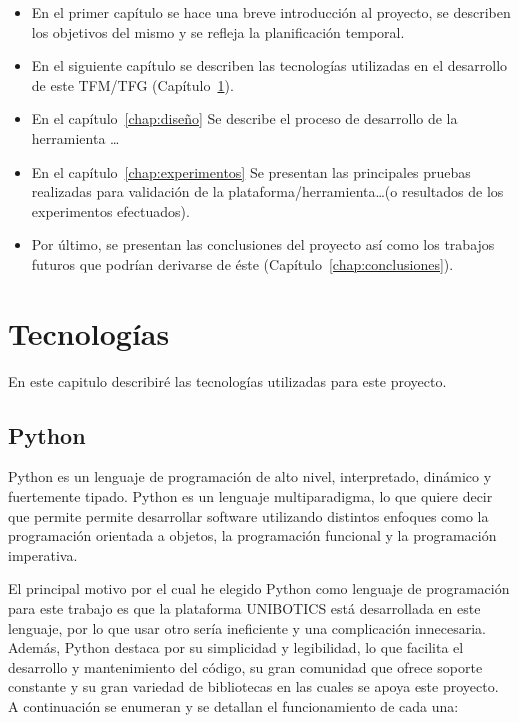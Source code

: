 \documentclass[a4paper, 12pt]{book}
\begin{document}
    \begin{itemize}
      \item En el primer capítulo se hace una breve introducción al proyecto, se describen los objetivos del mismo y se refleja la planificación temporal.
      \item En el siguiente capítulo se describen las tecnologías utilizadas en el desarrollo de este TFM/TFG (Capítulo~\ref{chap:tecnologias}).
      \item En el capítulo~\ref{chap:diseño} Se describe el proceso de desarrollo
      de la herramienta \ldots
      \item En el capítulo~\ref{chap:experimentos} Se presentan las principales pruebas realizadas
      para validación de la plataforma/herramienta\ldots (o resultados de los experimentos
      efectuados).
      \item Por último, se presentan las conclusiones del proyecto así como los trabajos futuros que podrían derivarse de éste (Capítulo~\ref{chap:conclusiones}).
    \end{itemize}

\cleardoublepage


\chapter{Tecnologías}               %
\label{chap:tecnologias}

En este capitulo describiré las tecnologías utilizadas para este proyecto.


\section{Python}
\label{sec:python}

Python es un lenguaje de programación de alto nivel, interpretado, dinámico y fuertemente tipado. Python es un lenguaje multiparadigma, lo que quiere decir que permite permite desarrollar software utilizando distintos enfoques como la programación orientada a objetos, la programación funcional y la programación imperativa.

El principal motivo por el cual he elegido Python como lenguaje de programación para este trabajo es que la plataforma UNIBOTICS está desarrollada en este lenguaje, por lo que usar otro sería ineficiente y una complicación innecesaria. Además, Python destaca por su simplicidad y legibilidad, lo que facilita el desarrollo y mantenimiento del código, su gran comunidad que ofrece soporte constante y su gran variedad de bibliotecas en las cuales se apoya este proyecto.
A continuación se enumeran y se detallan el funcionamiento de cada una: 
\end{document}
